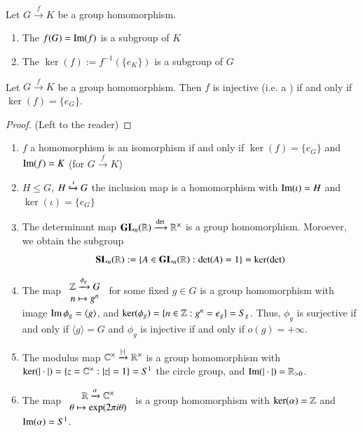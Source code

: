 \documentclass[12pt, a4paper, oneside, openright, titlepage]{book}
\begin{document}
\begin{cor}
        Let $G \xrightarrow{f} K$ be a group homomorphism. \begin{enumerate}
                \item The  $f(G) = \operatorname{Im}(f)$ is a subgroup of $K$
                \item The  $\ker(f) := f^{-1}(\{e_K\})$ is a subgroup of $G$
        \end{enumerate}
\end{cor}

\begin{prop}
        Let $G\xrightarrow{f} K$ be a group homomorphism. Then $f$ is injective (i.e. a ) if and only if $\ker(f) = \{e_G\}$.
\end{prop}
\begin{proof}
        (Left to the reader)
\end{proof}


\begin{eg}
        \leavevmode
        \begin{enumerate}
                \item $f$ a homomorphism is an isomorphism if and only if $\ker(f) = \{e_G\}$ and $\operatorname{Im}(f) = K$ (for $G\xrightarrow{f} K$)
                \item $H \leq G$, $H \xhookrightarrow{\iota} G$ the inclusion map is a homomorphism with $\operatorname{Im}(\iota) = H$ and $\ker(\iota) = \{e_G\}$
                \item The determinant map $\mathbf{GL}_n(\mathbb R)\xrightarrow{\det}\mathbb R^{\times}$ is a group homomorphism. Moroever, we obtain the subgroup \begin{equation}
                                \mathbf{SL}_n(\mathbb R) := \{A \in \mathbf{GL}_n(\mathbb R):\det(A) = 1\} = \ker(\det)
                        \end{equation}
                \item The map $\begin{array}{c} \mathbb Z\xrightarrow{\phi_g} G \\ n \mapsto g^n \end{array}$ for some fixed $g \in G$ is a group homomorphism with image $\operatorname{Im} \phi_g = \langle g \rangle$, and $\ker(\phi_g) = \{n \in \mathbb Z:g^n = e_g\} = S_g$. Thus, $\phi_g$ is surjective if and only if $\langle g\rangle = G$ and $\phi_g$ is injective if and only if $o(g) = +\infty$.
                \item The modulus map $\mathbb C^{\times} \xrightarrow{|\cdot|}\mathbb R^{\times}$ is a group homomorphism with $\ker(|\cdot|) = \{z = \mathbb C^{\times}:|z| = 1\} = S^1$ the circle group, and $\operatorname{Im}(|\cdot|) = \mathbb R_{>0}$.
                \item The map $\begin{array}{c} \mathbb R\xrightarrow{\alpha}\mathbb C^{\times} \\ \theta\mapsto \exp(2\pi i \theta) \end{array}$ is a group homomorphism with $\ker(\alpha) = \mathbb Z$ and $\operatorname{Im}(\alpha) = S^1$.
        \end{enumerate}
\end{eg}
\end{document}
